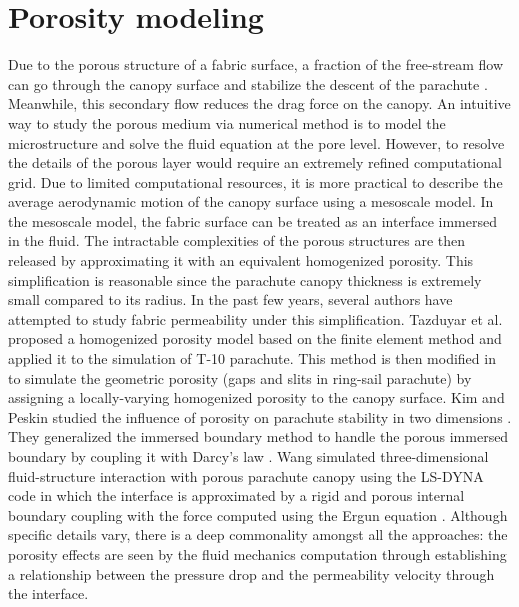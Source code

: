 \section{Porosity modeling}
Due to the porous structure of a
fabric surface, a fraction of the free-stream flow can go through the canopy
surface and stabilize the descent of the parachute \cite{Johari05}. 
Meanwhile, this secondary flow reduces the drag force on the canopy. 
An intuitive way to study the porous medium via numerical method is to model the microstructure and solve the fluid equation at the pore level. However, to resolve the details of the porous layer would require an extremely 
refined computational grid. Due to limited computational resources, it 
is more practical to describe the average aerodynamic motion of the 
canopy surface using a mesoscale model. In the mesoscale model, the 
fabric surface can be treated as an interface immersed in the fluid.
The intractable complexities of the porous structures are then released by 
approximating it with an equivalent homogenized porosity.  
This simplification is reasonable since the parachute canopy thickness is
extremely small compared to its radius. In the past few years, 
several authors have attempted to study fabric permeability
under this simplification. Tazduyar et al. \cite{TezduyarSathe2007IJNMF} proposed a
homogenized porosity model based on the finite element method and applied it 
to the simulation of T-10 parachute. This method is then modified in \cite{Takizawa2012ACME}
to simulate the geometric porosity (gaps and slits in ring-sail parachute) by assigning a locally-varying homogenized porosity to the canopy surface. 
Kim and Peskin studied the influence of porosity on
parachute stability in two dimensions \cite{kim2006twodim}. They generalized
the immersed boundary method to handle the porous immersed boundary by 
coupling it with Darcy's law \cite{nield2013}.  Wang \cite{wang2006porous} simulated 
three-dimensional fluid-structure interaction with porous parachute canopy using the
LS-DYNA code in which the interface is approximated by a rigid and porous
internal boundary coupling with the force computed using the Ergun equation \cite{nield2013}.
Although specific details vary, there is a deep commonality amongst all the approaches: the porosity effects are seen by the fluid mechanics computation through establishing a relationship between the pressure drop and the permeability velocity through the interface.


